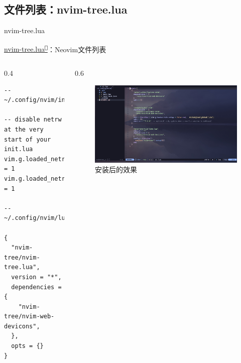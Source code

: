 \documentclass[aspectratio=169]{ctexbeamer}
\newcommand{\nerd}[1]{\texttt{#1}}
\newcommand{\link}[3][]{\href{#3}{#2\textsuperscript{\nerd{}}}}
\begin{document}
  \subsection{文件列表：nvim-tree.lua}
    \begin{frame}[fragile]{nvim-tree.lua}

      \link{nvim-tree.lua}{https://github.com/nvim-tree/nvim-tree.lua}：Neovim文件列表

      \begin{columns}
        \begin{column}{0.4\linewidth}
          \begin{lstlisting}[basicstyle=\tiny\ttfamily]
-- ~/.config/nvim/init.lua

-- disable netrw at the very start of your init.lua
vim.g.loaded_netrw = 1
vim.g.loaded_netrwPlugin = 1

-- ~/.config/nvim/lua/plugins/ui.lua

{
  "nvim-tree/nvim-tree.lua",
  version = "*",
  dependencies = {
    "nvim-tree/nvim-web-devicons",
  },
  opts = {}
}
          \end{lstlisting}
        \end{column}

        \begin{column}{0.6\linewidth}

          \begin{figure}[H]
            \centering
            \includegraphics[width=\linewidth]{./Figures/NvimTree_Finish.jpg}
            \caption{安装后的效果}%
          \end{figure}

        \end{column}
      \end{columns}

    \end{frame}
\end{document}
